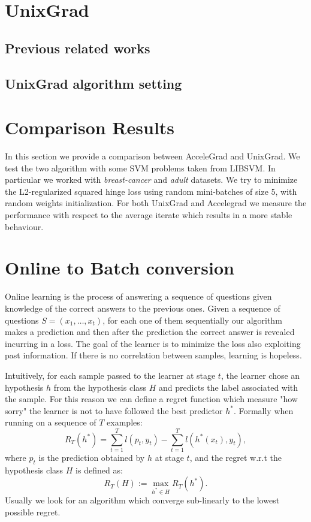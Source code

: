 \documentclass[12pt]{article}
\theoremstyle{definition}
\begin{document}
\section{UnixGrad}
\subsection{Previous related works}
\subsection{UnixGrad algorithm setting}

\section{Comparison Results}

In this section we provide a comparison between AcceleGrad and UnixGrad. We test the two algorithm with some SVM problems taken from LIBSVM. In particular we worked with \emph{breast-cancer} and \emph{adult} datasets. We try to minimize the L2-regularized squared hinge loss using random mini-batches of size 5, with random weights initialization. For both UnixGrad and Accelegrad we measure the performance with respect to the average iterate which results in a more stable behaviour. 


\section{Online to Batch conversion}

Online learning is the process of answering a sequence of questions given knowledge of the correct answers to the previous ones. Given a sequence of questions $S=(x_1, \dots, x_t)$, for each one of them sequentially our algorithm makes a prediction and then after the prediction the correct answer is revealed incurring in a loss. The goal of the learner is to minimize the loss also exploiting past information. If there is no correlation between samples, learning is hopeless.

Intuitively, for each sample passed to the learner at stage $t$, the learner chose an hypothesis $h$ from the hypothesis class $H$ and predicts the label associated with the sample. For this reason we can define a regret function which measure "how sorry" the learner is not to have followed the best predictor $h^*$. Formally when running on a sequence of $T$ examples:
$$
	R_T(h^*) = \sum_{t=1}^{T} l(p_t,y_t) - \sum_{t=1}^{T} l(h^*(x_t),y_t),
$$
where $p_t$ is the prediction obtained by $h$ at stage $t$, and the regret w.r.t the hypothesis class $H$ is defined as:
$$
	R_T(H) := \max_{h^* \in H} R_T(h^*).
$$
Usually we look for an algorithm which converge sub-linearly to the lowest possible regret.
\end{document}
